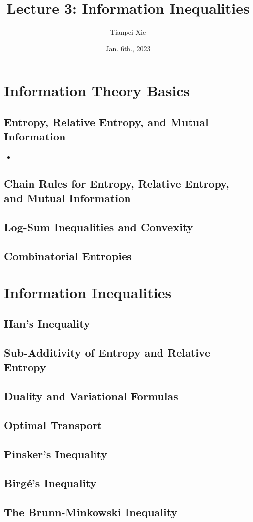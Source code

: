 \documentclass[11pt]{article}
\begin{document}
\title{Lecture 3: Information Inequalities}
\author{ Tianpei Xie}
\date{Jan. 6th., 2023 }
\maketitle
\tableofcontents
\newpage
\section{Information Theory Basics}
\subsection{Entropy, Relative Entropy, and Mutual Information}
\begin{itemize}
\item 
\end{itemize}
\subsection{Chain Rules for Entropy, Relative Entropy, and Mutual Information}
\subsection{Log-Sum Inequalities and Convexity}

\subsection{Combinatorial Entropies}

\section{Information Inequalities}

\subsection{Han's Inequality}

\subsection{Sub-Additivity of Entropy and Relative Entropy}

\subsection{Duality and Variational Formulas}

\subsection{Optimal Transport}

\subsection{Pinsker's Inequality}

\subsection{Birg{\'e}'s Inequality}

\subsection{The Brunn-Minkowski Inequality}
\newpage


\end{document}
